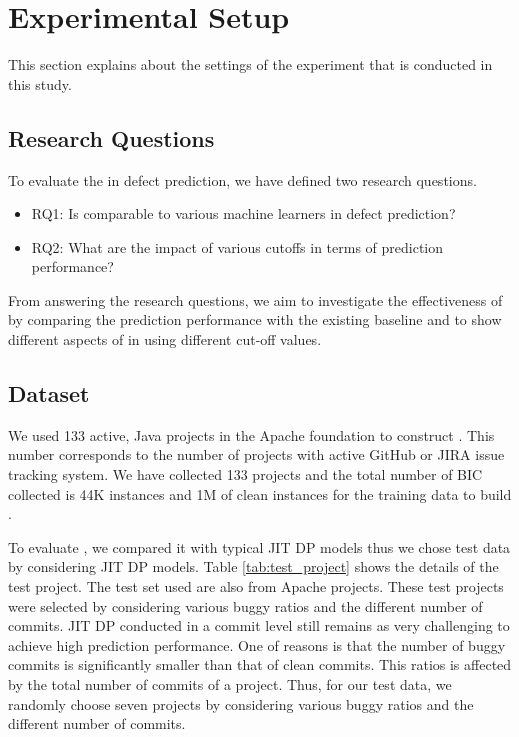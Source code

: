 \section{Experimental Setup}
This section explains about the settings of the experiment that is conducted in this study.

\subsection{Research Questions}
To evaluate the {\simfinmo} in defect prediction, we have defined two research questions.

\begin{itemize}
    \item RQ1: Is {\simfinmo} comparable to various machine learners in defect prediction?
    \item RQ2: What are the impact of various {\simfinmo} cutoffs in terms of prediction performance?
\end{itemize}

From answering the research questions, we aim to investigate the effectiveness of {\simfinmo} by comparing the prediction performance with the existing baseline and to show different aspects of {\simfinmo} in using different cut-off values.

\subsection{Dataset}
We used 133 active, Java projects in the Apache foundation to construct {\simfin}.
This number corresponds to the number of projects with active GitHub or JIRA issue tracking system.
We have collected 133 projects and the total number of BIC collected is 44K instances and 1M of clean instances for the training data to build {\simfin}.

To evaluate {\simfinmo}, we compared it with typical JIT DP models thus we chose test data by considering JIT DP models. Table \ref{tab:test_project} shows the details of the test project. The test set used are also from Apache projects. These test projects were selected by considering various buggy ratios and the different number of commits.
JIT DP conducted in a commit level still remains as very challenging to achieve high prediction performance. One of reasons is that the number of buggy commits is significantly smaller than that of clean commits. This ratios is affected by the total number of commits of a project. Thus, for our test data, we randomly choose seven projects by considering various buggy ratios and the different number of commits.


